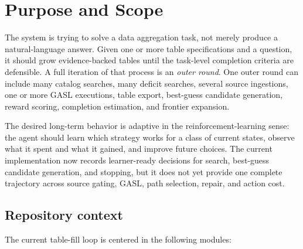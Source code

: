 \documentclass[11pt]{article}
\begin{document}
\section{Purpose and Scope}

The system is trying to solve a data aggregation task, not merely produce a
natural-language answer.  Given one or more table specifications and a question,
it should grow evidence-backed tables until the task-level completion criteria
are defensible.  A full iteration of that process is an \emph{outer round}.  One
outer round can include many catalog searches, many deficit searches, several
source ingestions, one or more GASL executions, table export, best-guess
candidate generation, reward scoring, completion estimation, and frontier
expansion.

The desired long-term behavior is adaptive in the reinforcement-learning sense:
the agent should learn which strategy works for a class of current states,
observe what it spent and what it gained, and improve future choices.  The
current implementation now records learner-ready decisions for search,
best-guess candidate generation, and stopping, but it does not yet provide one
complete trajectory across source gating, GASL, path selection, repair, and
action cost.

\subsection{Repository context}

The current table-fill loop is centered in the following modules:
\end{document}
